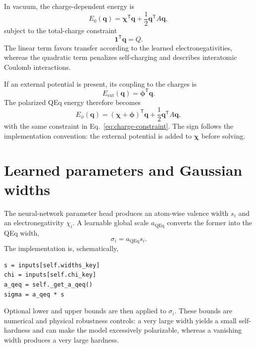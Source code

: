 \documentclass[11pt,a4paper]{article}
\newcommand{\vect}[1]{\bm{#1}}
\newcommand{\ones}{\vect{1}}
\begin{document}
In vacuum, the charge-dependent energy is
\begin{equation}
  E_0(\vect q)
  = \vect\chi^{\mathsf T}\vect q
  + \frac{1}{2}\vect q^{\mathsf T}A\vect q,
  \label{eq:vacuum-energy}
\end{equation}
subject to the total-charge constraint
\begin{equation}
  \ones^{\mathsf T}\vect q=Q.
  \label{eq:charge-constraint}
\end{equation}
The linear term favors transfer according to the learned electronegativities,
whereas the quadratic term penalizes self-charging and describes interatomic
Coulomb interactions.

If an external potential is present, its coupling to the charges is
\begin{equation}
  E_{\mathrm{ext}}(\vect q)=\vect\phi^{\mathsf T}\vect q.
\end{equation}
The polarized QEq energy therefore becomes
\begin{equation}
  E_{\phi}(\vect q)
  =(\vect\chi+\vect\phi)^{\mathsf T}\vect q
  +\frac{1}{2}\vect q^{\mathsf T}A\vect q,
  \label{eq:polarized-energy}
\end{equation}
with the same constraint in Eq.~\eqref{eq:charge-constraint}.  The sign follows
the implementation convention: the external potential is added to $\vect\chi$
before solving.

\section{Learned parameters and Gaussian widths}

The neural-network parameter head produces an atom-wise valence width $s_i$ and
an electronegativity $\chi_i$.  A learnable global scale $a_{\mathrm{QEq}}$
converts the former into the QEq width,
\begin{equation}
  \sigma_i=a_{\mathrm{QEq}}s_i.
\end{equation}
The implementation is, schematically,
\begin{lstlisting}[style=pythonstyle]
s = inputs[self.widths_key]
chi = inputs[self.chi_key]
a_qeq = self._get_a_qeq()
sigma = a_qeq * s
\end{lstlisting}
Optional lower and upper bounds are then applied to $\sigma_i$.  These bounds
are numerical and physical robustness controls: a very large width yields a
small self-hardness and can make the model excessively polarizable, whereas a
vanishing width produces a very large hardness.
\end{document}

